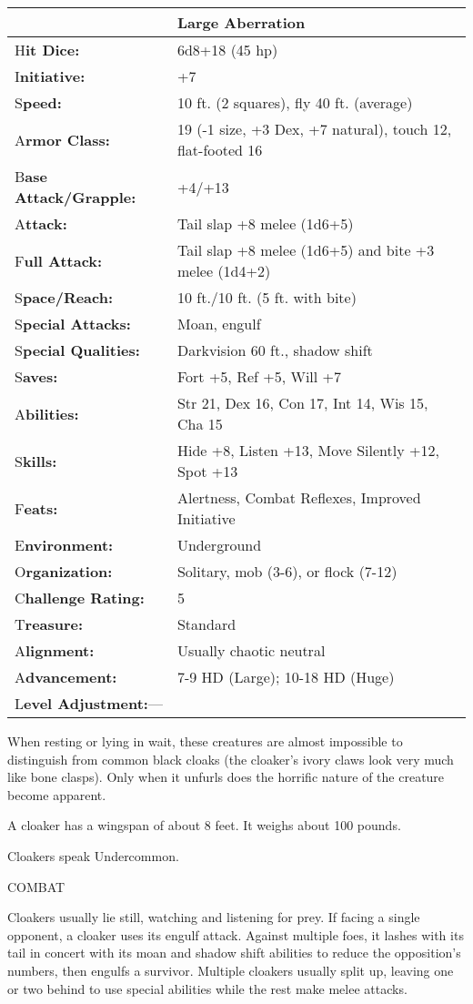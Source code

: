 \documentclass{article}
\begin{document}
\begin{tabular}{|>{\raggedright}p{91pt}|>{\raggedright}p{226pt}|}
\hline
  & Large Aberration\tabularnewline
\hline
H\textbf{it Dice:} & 6d8+18 (45 hp)\tabularnewline
\hline
I\textbf{nitiative:} & +7\tabularnewline
\hline
S\textbf{peed:} & 10 ft. (2 squares), fly 40 ft. (average)\tabularnewline
\hline
A\textbf{rmor Class:} & 19 (-1 size, +3 Dex, +7 natural), touch 12, flat-footed 
16\tabularnewline
\hline
B\textbf{ase Attack/Grapple:} & +4/+13 \tabularnewline
\hline
A\textbf{ttack:} & Tail slap +8 melee (1d6+5)\tabularnewline
\hline
F\textbf{ull Attack:} & Tail slap +8 melee (1d6+5) and bite +3 melee (1d4+2)\tabularnewline
\hline
S\textbf{pace/Reach:} & 10 ft./10 ft. (5 ft. with bite)\tabularnewline
\hline
S\textbf{pecial Attacks:} & Moan, engulf\tabularnewline
\hline
S\textbf{pecial Qualities:} & Darkvision 60 ft., shadow shift\tabularnewline
\hline
S\textbf{aves:} & Fort +5, Ref +5, Will +7\tabularnewline
\hline
A\textbf{bilities:} & Str 21, Dex 16, Con 17, Int 14, Wis 15, Cha 15\tabularnewline
\hline
S\textbf{kills:} & Hide +8, Listen +13, Move Silently +12, Spot +13\tabularnewline
\hline
F\textbf{eats:} & Alertness, Combat Reflexes, Improved Initiative\tabularnewline
\hline
E\textbf{nvironment:} & Underground\tabularnewline
\hline
O\textbf{rganization:} & Solitary, mob (3-6), or flock (7-12)\tabularnewline
\hline
C\textbf{hallenge Rating:} & 5\tabularnewline
\hline
T\textbf{reasure:} & Standard\tabularnewline
\hline
A\textbf{lignment:} & Usually chaotic neutral\tabularnewline
\hline
A\textbf{dvancement:} & 7-9 HD (Large); 10-18 HD (Huge)\tabularnewline
\hline
L\textbf{evel Adjustment:}--- & \tabularnewline
\hline
\end{tabular}

When resting or lying in wait, these creatures are almost impossible to distinguish 
from common black cloaks (the cloaker's ivory claws look very much like bone clasps). 
Only when it unfurls does the horrific nature of the creature become apparent.

A cloaker has a wingspan of about 8 feet. It weighs about 100 pounds.

Cloakers speak Undercommon.

COMBAT

Cloakers usually lie still, watching and listening for prey. If facing a single 
opponent, a cloaker uses its engulf attack. Against multiple foes, it lashes with 
its tail in concert with its moan and shadow shift abilities to reduce the opposition's 
numbers, then engulfs a survivor. Multiple cloakers usually split up, leaving one 
or two behind to use special abilities while the rest make melee attacks.
\end{document}
